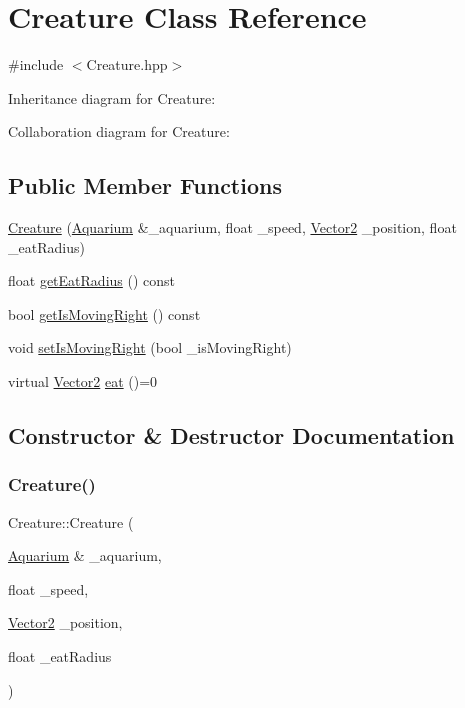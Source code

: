 \hypertarget{class_creature}{}\section{Creature Class Reference}
\label{class_creature}


{\ttfamily \#include $<$Creature.\+hpp$>$}



Inheritance diagram for Creature\+:


Collaboration diagram for Creature\+:
\subsection*{Public Member Functions}
\begin{DoxyCompactItemize}
\item 
\mbox{\hyperlink{class_creature_ab12ad708dcef6c9cd0509f6769a6329a}{Creature}} (\mbox{\hyperlink{class_aquarium}{Aquarium}} \&\+\_\+aquarium, float \+\_\+speed, \mbox{\hyperlink{struct_vector2}{Vector2}} \+\_\+position, float \+\_\+eat\+Radius)
\item 
float \mbox{\hyperlink{class_creature_a24e52cedddd872269f83671c9a6f6925}{get\+Eat\+Radius}} () const
\item 
bool \mbox{\hyperlink{class_creature_a63abd829cfac5d57425452b39f2a21b7}{get\+Is\+Moving\+Right}} () const
\item 
void \mbox{\hyperlink{class_creature_a7b222797d42b668ebf2a02eef51feaf8}{set\+Is\+Moving\+Right}} (bool \+\_\+is\+Moving\+Right)
\item 
virtual \mbox{\hyperlink{struct_vector2}{Vector2}} \mbox{\hyperlink{class_creature_a0d531a4c04c1021833ddb0e48864dbf4}{eat}} ()=0
\end{DoxyCompactItemize}


\subsection{Constructor \& Destructor Documentation}
\mbox{\label{class_creature_ab12ad708dcef6c9cd0509f6769a6329a}} 
\subsubsection{\texorpdfstring{Creature()}{Creature()}}
{\footnotesize\ttfamily Creature\+::\+Creature (\begin{DoxyParamCaption}\item[{\mbox{\hyperlink{class_aquarium}{Aquarium}} \&}]{\+\_\+aquarium,  }\item[{float}]{\+\_\+speed,  }\item[{\mbox{\hyperlink{struct_vector2}{Vector2}}}]{\+\_\+position,  }\item[{float}]{\+\_\+eat\+Radius }\end{DoxyParamCaption})}



